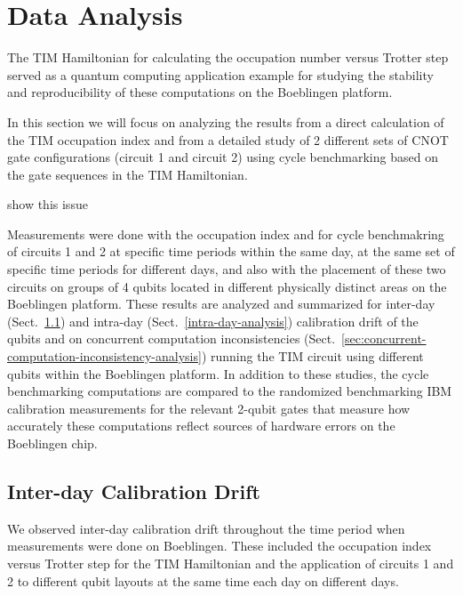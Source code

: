
\section{Data Analysis}
\label{sec:data-analysis}

The TIM Hamiltonian for calculating the occupation number versus Trotter step served as a quantum computing application example for studying the stability and reproducibility of these computations on the Boeblingen platform.  

In this section we will focus on analyzing the results from a direct calculation of the TIM occupation index and from a detailed study of 2 different sets of CNOT gate configurations (circuit 1 and circuit 2) 
using cycle benchmarking based on the gate sequences in the TIM Hamiltonian. 





show this issue 



Measurements were done with the occupation index and for cycle benchmakring of circuits 1 and 2 at specific time periods within the same day, at the same set of specific time periods for different days, and also with the placement of these two circuits on groups of 4 qubits located in different physically distinct areas on the Boeblingen platform. These results are analyzed and summarized for inter-day (Sect.~\ref{inter-day-analysis}) and intra-day (Sect.~\ref{intra-day-analysis}) calibration drift of the qubits and on concurrent computation inconsistencies (Sect.~\ref{sec:concurrent-computation-inconsistency-analysis}) running the TIM circuit using different qubits within the Boeblingen platform.  In addition to these studies, the cycle benchmarking computations are compared to the randomized benchmarking IBM calibration measurements for the relevant 2-qubit gates that measure how accurately these computations reflect sources of hardware errors on the Boeblingen chip.

\subsection{Inter-day Calibration Drift}
\label{inter-day-analysis}


We observed inter-day calibration drift throughout the time period when measurements were done on Boeblingen.  These included the occupation index versus Trotter step for the TIM Hamiltonian and the application of circuits 1 and 2 to different qubit layouts at the same time each day on different days. 

